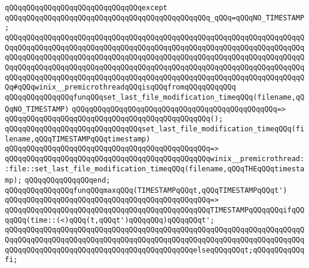 \verb|qQQqqQQqqQQqqQQqqQQqqQQqqQQqqQQqexcept|\newline
\verb|qQQqqQQqqQQqqQQqqQQqqQQqqQQqqQQqqQQqqQQqqQQqqQQq_qQQq=qQQqNO_TIMESTAMP;|\newline
\newline
\verb|qQQqqQQqqQQqqQQqqQQqqQQqqQQqqQQqqQQqqQQqqQQqqQQqqQQqqQQqqQQqqQQqqQQqqQQqqQQqqQQqqQQqqQQqqQQqqQQqqQQqqQQqqQQqqQQqqQQqqQQqqQQqqQQqqQQqqQQqqQQqqQQqqQQqqQQqqQQqqQQqqQQqqQQqqQQqqQQqqQQqqQQqqQQqqQQqqQQqqQQqqQQqqQQqqQQqqQQqqQQqqQQqqQQqqQQqqQQqqQQqqQQqqQQqqQQqqQQqqQQqqQQqqQQqqQQqqQQqqQQqqQQqqQQqqQQqqQQqqQQqqQQqqQQqqQQqqQQqqQQqqQQqqQQqqQQqqQQqqQQqqQQqqQQqqQQq#qQQqwinix__premicrothreadqQQqisqQQqfromqQQqqQQqqQQq|\newline
\newline
\verb|qQQqqQQqqQQqqQQqfunqQQqset_last_file_modification_timeqQQq(filename,qQQqNO_TIMESTAMP)|\newline
\verb|qQQqqQQqqQQqqQQqqQQqqQQqqQQqqQQqqQQqqQQqqQQqqQQq=>|\newline
\verb|qQQqqQQqqQQqqQQqqQQqqQQqqQQqqQQqqQQqqQQqqQQqqQQq();|\newline
\newline
\verb|qQQqqQQqqQQqqQQqqQQqqQQqqQQqqQQqset_last_file_modification_timeqQQq(filename,qQQqTIMESTAMPqQQqtimestamp)|\newline
\verb|qQQqqQQqqQQqqQQqqQQqqQQqqQQqqQQqqQQqqQQqqQQqqQQq=>|\newline
\verb|qQQqqQQqqQQqqQQqqQQqqQQqqQQqqQQqqQQqqQQqqQQqqQQqwinix__premicrothread::file::set_last_file_modification_timeqQQq(filename,qQQqTHEqQQqtimestamp);|\newline
\verb|qQQqqQQqqQQqqQQqend;|\newline
\newline
\newline
\verb|qQQqqQQqqQQqqQQqfunqQQqmaxqQQq(TIMESTAMPqQQqt,qQQqTIMESTAMPqQQqt')|\newline
\verb|qQQqqQQqqQQqqQQqqQQqqQQqqQQqqQQqqQQqqQQqqQQqqQQq=>|\newline
\verb|qQQqqQQqqQQqqQQqqQQqqQQqqQQqqQQqqQQqqQQqqQQqqQQqTIMESTAMPqQQqqQQqifqQQqqQQq(time::(<)qQQq(t,qQQqt')qQQqqQQq)qQQqqQQqt';|\newline
\verb|qQQqqQQqqQQqqQQqqQQqqQQqqQQqqQQqqQQqqQQqqQQqqQQqqQQqqQQqqQQqqQQqqQQqqQQqqQQqqQQqqQQqqQQqqQQqqQQqqQQqqQQqqQQqqQQqqQQqqQQqqQQqqQQqqQQqqQQqqQQqqQQqqQQqqQQqqQQqqQQqqQQqqQQqqQQqqQQqqQQqqQQqelseqQQqqQQqt;qQQqqQQqqQQqfi;|\newline
\newline

